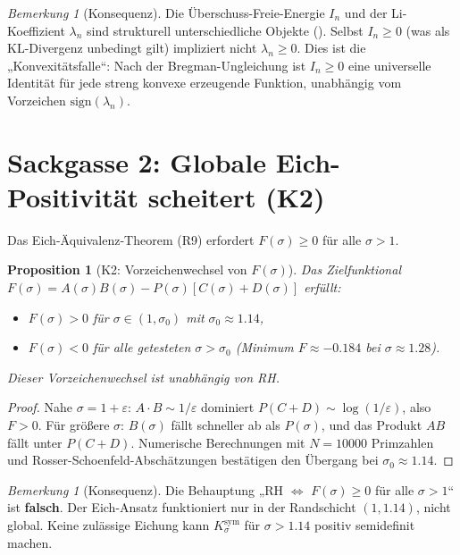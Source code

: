 \documentclass[12pt,a4paper]{article}
\newtheorem{proposition}[theorem]{Proposition}
\theoremstyle{definition}
\theoremstyle{remark}
\newtheorem{remark}[theorem]{Bemerkung}
\newcommand{\Ksym}{K_\sigma^{\mathrm{sym}}}
\begin{document}
\begin{remark}[Konsequenz]
Die Überschuss-Freie-Energie $I_n$ und der Li-Koeffizient $\lambda_n$ sind strukturell unterschiedliche Objekte (). Selbst $I_n \geq 0$ (was als KL-Divergenz unbedingt gilt) impliziert nicht $\lambda_n \geq 0$. Dies ist die „Konvexitätsfalle“: Nach der Bregman-Ungleichung ist $I_n \geq 0$ eine universelle Identität für jede streng konvexe erzeugende Funktion, unabhängig vom Vorzeichen $\mathrm{sign}(\lambda_n)$.
\end{remark}


\section{Sackgasse 2: Globale Eich-Positivität scheitert (K2)}
\label{sec:K2}

Das Eich-Äquivalenz-Theorem (R9) erfordert $F(\sigma) \geq 0$ für alle $\sigma > 1$.

\begin{proposition}[K2: Vorzeichenwechsel von $F(\sigma)$]
\label{prop:K2}
Das Zielfunktional $F(\sigma) = A(\sigma)B(\sigma) - P(\sigma)[C(\sigma) + D(\sigma)]$ erfüllt:
\begin{itemize}
  \item $F(\sigma) > 0$ für $\sigma \in (1, \sigma_0)$ mit $\sigma_0 \approx 1.14$,
  \item $F(\sigma) < 0$ für alle getesteten $\sigma > \sigma_0$ (Minimum $F \approx -0.184$ bei $\sigma \approx 1.28$).
\end{itemize}
Dieser Vorzeichenwechsel ist unabhängig von RH.
\end{proposition}

\begin{proof}
Nahe $\sigma = 1 + \varepsilon$: $A \cdot B \sim 1/\varepsilon$ dominiert $P(C+D) \sim \log(1/\varepsilon)$, also $F > 0$. Für größere $\sigma$: $B(\sigma)$ fällt schneller ab als $P(\sigma)$, und das Produkt $AB$ fällt unter $P(C+D)$. Numerische Berechnungen mit $N = 10000$ Primzahlen und Rosser-Schoenfeld-Abschätzungen bestätigen den Übergang bei $\sigma_0 \approx 1.14$.
\end{proof}

\begin{remark}[Konsequenz]
Die Behauptung „RH $\Leftrightarrow$ $F(\sigma) \geq 0$ für alle $\sigma > 1$“ ist \textbf{falsch}. Der Eich-Ansatz funktioniert nur in der Randschicht $(1, 1.14)$, nicht global. Keine zulässige Eichung kann $\Ksym$ für $\sigma > 1.14$ positiv semidefinit machen.
\end{remark}
\end{document}
